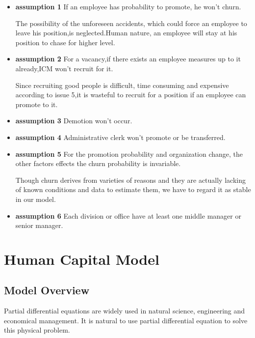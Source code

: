 \documentclass[12pt,a4paper,titlepage]{article}
\begin{document}
\begin{itemize}
\item \textbf{assumption 1} If an employee has probability to
  promote, he won't churn.

The possibility of the unforeseen accidents, which could force an
employee to leave his position,is neglected.Human nature, an employee
will stay at his position to chase for higher level.

\item \textbf{assumption 2} For a vacancy,if there exists an
  employee measures up to it already,ICM won't recruit for it.

Since recruiting good people is difficult, time consuming and
expensive according to issue 5,it is wasteful to recruit for a
position if an employee can promote to it.

\item \textbf{assumption 3} Demotion won't occur.

\item \textbf{assumption 4} Administrative clerk won't promote or be
  transferred.

\item \textbf{assumption 5} For the promotion probability and
  organization change, the other factors effects the churn probability
  is invariable.

Though churn derives from varieties of reasons and they are actually
lacking of known conditions and data to estimate them, we have to
regard it as stable in our model.

\item \textbf{assumption 6} Each division or office have at least one
  middle manager or senior manager.

\end{itemize}

\section{Human Capital Model}
\label{sec:human-capital-model}

\subsection{Model Overview}
\label{sec:model-overview}

Partial differential equations are widely used in natural science, engineering and economical management.
It is natural to use partial differential equation to solve this physical problem. 
\end{document}
